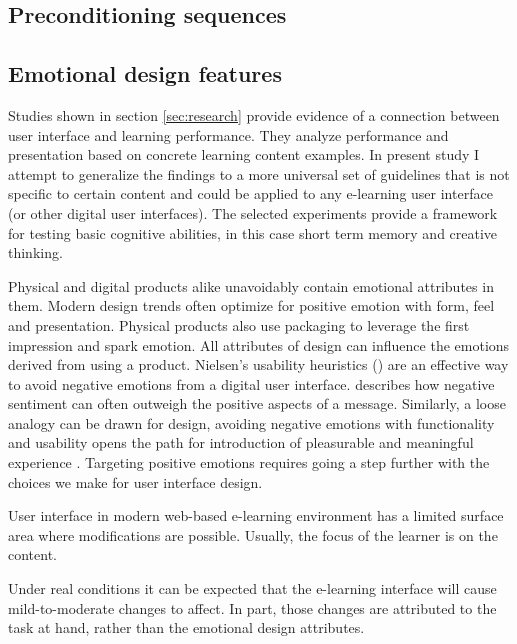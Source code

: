 	\subsection{Preconditioning sequences} \label{sec:preconditioning}
	
	
	
	\subsection{Emotional design features} \label{sec:emotional-design-features}

	Studies shown in section \ref{sec:research} provide evidence of a connection between user interface and learning performance. They analyze performance and presentation based on concrete learning content examples. In present study I attempt to generalize the findings to a more universal set of guidelines that is not specific to certain content and could be applied to any e-learning user interface (or other digital user interfaces). The selected experiments provide a framework for testing basic cognitive abilities, in this case short term memory and creative thinking.
	
	Physical and digital products alike unavoidably contain emotional attributes in them. Modern design trends often optimize for positive emotion with form, feel and presentation. Physical products also use packaging to leverage the first impression and spark emotion. All attributes of design can influence the emotions derived from using a product. 
	Nielsen's usability heuristics (\cite{Nielsen1993}) are an effective way to avoid negative emotions from a digital user interface. \cite{Walther2001} describes how negative sentiment can often outweigh the positive aspects of a message. Similarly, a loose analogy can be drawn for design, avoiding negative emotions with functionality and usability opens the path for introduction of pleasurable and meaningful experience \cite{Ruston2017}.
	Targeting positive emotions requires going a step further with the choices we make for user interface design.

	User interface in modern web-based e-learning environment has a limited surface area where modifications are possible. Usually, the focus of the learner is on the content. 
	
	Under real conditions it can be expected that the e-learning interface will cause mild-to-moderate changes to affect. In part, those changes are attributed to the task at hand, rather than the emotional design attributes. 
	
